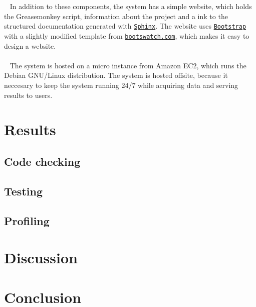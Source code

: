 \documentclass[10pt]{IEEEtran}
\begin{document}
\\~
\\~
In addition to these components, the system has a simple website, which holds the Greasemonkey script, information about the project and a ink to the structured documentation generated with \href{http://sphinx-doc.org/}{\texttt{Sphinx}}. The website uses \href{http://getbootstrap.com/}{\texttt{Bootstrap}} with a slightly modified template from \href{http://bootswatch.com/flatly/}{\texttt{bootswatch.com}}, which makes it easy to design a website.
\\~
\\~
The system is hosted on a micro instance from Amazon EC2, which runs the Debian GNU/Linux distribution. The system is hosted offsite, because it neccesary to keep the system running 24/7 while acquiring data and serving results to users.

\section{Results}


\subsection{Code checking}


\subsection{Testing}


\subsection{Profiling}


\section{Discussion}


\section{Conclusion}



\end{document}
